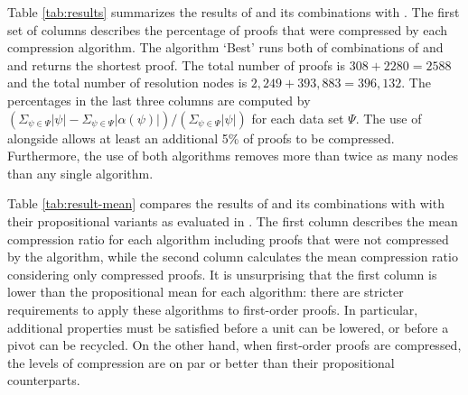 {Table \ref{tab:results} summarizes the results of {\FORPI} and its combinations with {\GFOLU}. The first set of columns describes the percentage of proofs that were compressed by each compression algorithm. The algorithm `Best' runs both of combinations of {\GFOLU} and {\FORPI} and returns the shortest proof. The total number of proofs is $308+2280=2588$ and the total number of resolution nodes is $2,249 + 393,883
= 396,132$. The percentages in the last three columns are computed by $(\Sigma_{\psi \in \Psi} |\psi|  - \Sigma_{\psi\in \Psi} |\alpha(\psi)|)/(\Sigma_{\psi \in \Psi} |\psi|)$ for each data set $\Psi$. The use of {\FORPI} alongside {\GFOLU} allows at least an additional 5\% of proofs to be compressed. Furthermore, the use of both algorithms removes more than twice as many nodes than any single algorithm.

Table \ref{tab:result-mean} compares the results of {\FORPI} and its combinations with {\GFOLU} with their propositional variants as evaluated in  \cite{Boudou}. The first column describes the mean compression ratio for each algorithm including proofs that were not compressed by the algorithm, while the second column calculates the mean compression ratio considering only compressed proofs. It is unsurprising that the first column is lower than the propositional mean for each algorithm: there are stricter requirements to apply these algorithms to first-order proofs. In particular, additional properties must be satisfied before a unit can be lowered, or before a pivot can be recycled. On the other hand, when first-order proofs are compressed, the levels of compression are on par or better than their propositional counterparts.

\begin{figure}[p]
    

\end{figure}}
